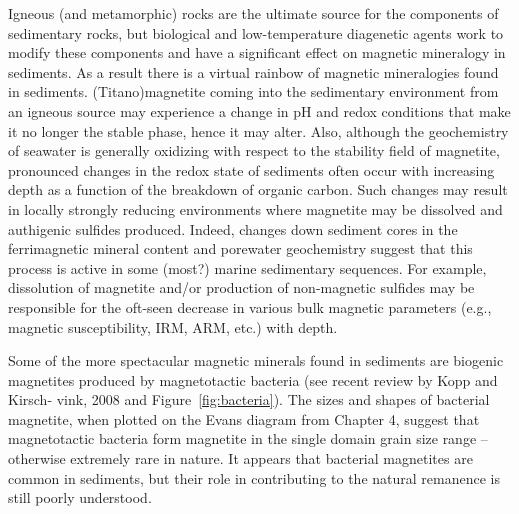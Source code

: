 Igneous (and metamorphic) rocks are the ultimate source for the components of sedimentary rocks, but biological and low-temperature diagenetic agents work to modify these components and have a significant effect on magnetic mineralogy in sediments.  As a result there is a virtual rainbow of magnetic mineralogies found in sediments.     (Titano)magnetite coming into the sedimentary environment from an igneous source may experience a change in pH and redox conditions that make it no longer the stable phase, hence it may alter.   
Also,   although the geochemistry of seawater is generally oxidizing with respect to the stability field of magnetite, pronounced changes in the redox state of sediments often occur with increasing depth as a function of the breakdown of organic carbon.  Such changes may result in locally strongly reducing environments where magnetite may be dissolved and authigenic sulfides produced.  Indeed,  changes down sediment cores  in the ferrimagnetic mineral content and porewater geochemistry suggest that this process is active in some (most?) marine sedimentary sequences. For example, dissolution of magnetite and/or production of non-magnetic sulfides may be responsible for the oft-seen decrease in various bulk magnetic parameters (e.g., magnetic susceptibility, IRM, ARM, etc.) with depth.   




Some of the more spectacular magnetic minerals found in sediments are biogenic magnetites produced by magnetotactic bacteria (see recent review by Kopp and Kirsch- vink, 2008 and Figure~\ref{fig:bacteria}).   The sizes and shapes of
 bacterial magnetite, when plotted on the 
 Evans diagram from Chapter 4, suggest that magnetotactic bacteria form magnetite in the single domain grain size range -- otherwise extremely rare in nature.    It appears that  bacterial magnetites are common in sediments, but their role in contributing to the  natural remanence is still poorly understood. 



